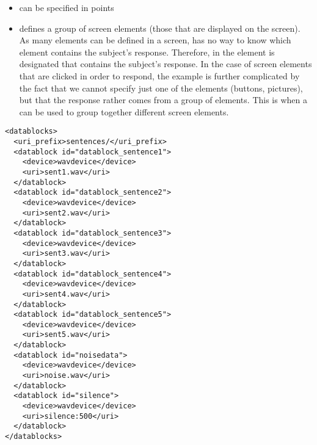 \begin{itemize}
\begin{itemize}
\item {} can be specified in points

\item {} defines a group of screen elements
(those that are displayed on the screen). As many elements can be
defined in a screen, \apex has no way to know which element
contains the subject's response. Therefore, in
 the element is designated that
contains the subject's response. In the case of screen elements
that are clicked in order to respond, the example is further
complicated by the fact that we cannot specify just one of the
elements (buttons, pictures), but that the response rather comes
from a group of elements. This is when a  can
be used to group together different screen elements.


\end{itemize}
\end{itemize}
  
   
  

\begin{lstlisting}
<datablocks>
  <uri_prefix>sentences/</uri_prefix>
  <datablock id="datablock_sentence1">
    <device>wavdevice</device>
    <uri>sent1.wav</uri>
  </datablock>
  <datablock id="datablock_sentence2">
    <device>wavdevice</device>
    <uri>sent2.wav</uri>
  </datablock>
  <datablock id="datablock_sentence3">
    <device>wavdevice</device>
    <uri>sent3.wav</uri>
  </datablock>
  <datablock id="datablock_sentence4">
    <device>wavdevice</device>
    <uri>sent4.wav</uri>
  </datablock>
  <datablock id="datablock_sentence5">
    <device>wavdevice</device>
    <uri>sent5.wav</uri>
  </datablock>
  <datablock id="noisedata">
    <device>wavdevice</device>
    <uri>noise.wav</uri>
  </datablock>
  <datablock id="silence">
    <device>wavdevice</device>
    <uri>silence:500</uri>
  </datablock>
</datablocks>
\end{lstlisting}


